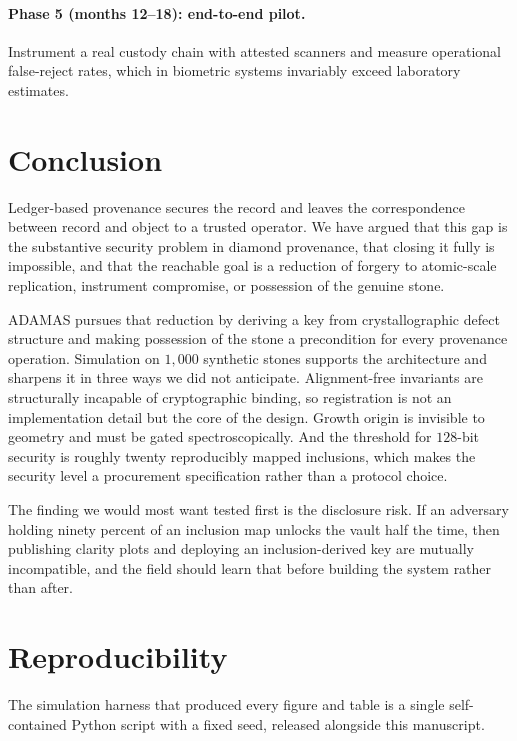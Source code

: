 \documentclass[10pt,twocolumn]{article}
\theoremstyle{remark}
\begin{document}
\paragraph{Phase 5 (months 12--18): end-to-end pilot.} Instrument a real custody
chain with attested scanners and measure operational false-reject rates, which
in biometric systems invariably exceed laboratory estimates.

\section{Conclusion}

Ledger-based provenance secures the record and leaves the correspondence between
record and object to a trusted operator. We have argued that this gap is the
substantive security problem in diamond provenance, that closing it fully is
impossible, and that the reachable goal is a reduction of forgery to atomic-scale
replication, instrument compromise, or possession of the genuine stone.

ADAMAS pursues that reduction by deriving a key from crystallographic defect
structure and making possession of the stone a precondition for every provenance
operation. Simulation on $1{,}000$ synthetic stones supports the architecture and
sharpens it in three ways we did not anticipate. Alignment-free invariants are
structurally incapable of cryptographic binding, so registration is not an
implementation detail but the core of the design. Growth origin is invisible to
geometry and must be gated spectroscopically. And the threshold for $128$-bit
security is roughly twenty reproducibly mapped inclusions, which makes the
security level a procurement specification rather than a protocol choice.

The finding we would most want tested first is the disclosure risk. If an
adversary holding ninety percent of an inclusion map unlocks the vault half the
time, then publishing clarity plots and deploying an inclusion-derived key are
mutually incompatible, and the field should learn that before building the
system rather than after.

\section*{Reproducibility}

The simulation harness that produced every figure and table is a single
self-contained Python script with a fixed seed, released alongside this
manuscript.
\end{document}
